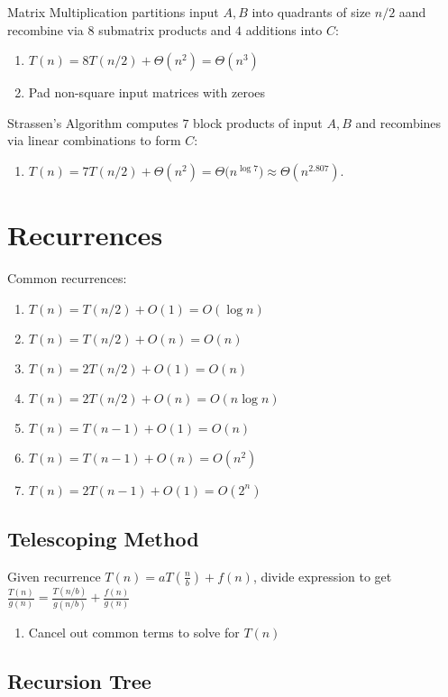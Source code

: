 \documentclass[12pt, a4paper]{article}
\begin{document}
\begin{multicols*}{3}
Matrix Multiplication partitions input $A, B$ into quadrants of size $n /2$ aand recombine via $8$ submatrix products and $4$ additions into $C$:
\begin{enumerate}[\roman*.]
  \item $T(n)=8T(n/2)+\Theta(n^{2})=\Theta(n^{3})$
  \item Pad non-square input matrices with zeroes
\end{enumerate}

Strassen’s Algorithm computes $7$ block products of input $A,B$ and recombines via linear combinations to form $C$:
\begin{enumerate}[\roman*.]
  \item $T(n)=7T(n/2)+\Theta(n^{2})=\Theta\!\big(n^{\log 7}\big)\approx \Theta(n^{2.807})$.
\end{enumerate}
\colbreak

\section{Recurrences}

Common recurrences:
\begin{enumerate}[\roman*.]
  \item $T(n) = T(n/2) + O(1) = O(\log n)$
  \item $T(n) = T(n/2) + O(n) = O(n)$
  \item $T(n) = 2T(n/2) + O(1) = O(n)$
  \item $T(n) = 2T(n/2) + O(n) = O(n\log n)$
  \item $T(n) = T(n - 1) + O(1) = O(n)$
  \item $T(n) = T(n - 1) + O(n) = O(n^2)$
  \item $T(n) = 2T(n - 1) + O(1) = O(2^n)$
\end{enumerate}

\subsection{Telescoping Method}

Given recurrence $T(n) = aT(\frac{n}{b}) + f(n)$, divide expression to get $\frac{T(n)}{g(n)} = \frac{T(n /b)}{g(n /b)} + \frac{f(n)}{g(n)}$
\begin{enumerate}[\roman*.]
  \item Cancel out common terms to solve for $T(n)$
\end{enumerate}

\subsection{Recursion Tree}


\end{multicols*}
\end{document}
